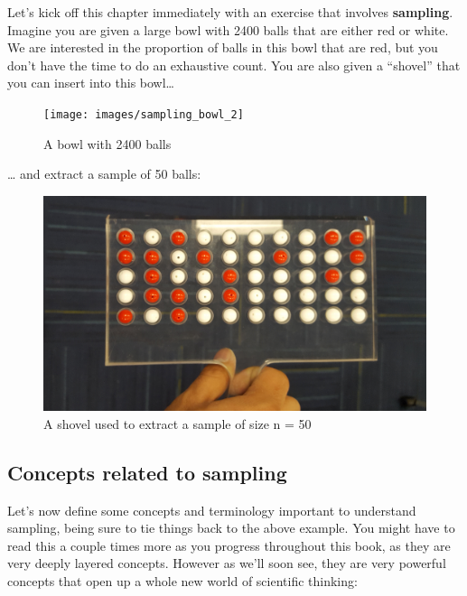 \documentclass[12pt,]{krantz}
\theoremstyle{definition}
\theoremstyle{definition}
\theoremstyle{definition}
\theoremstyle{remark}
\begin{document}
Let's kick off this chapter immediately with an exercise that involves
\textbf{sampling}. Imagine you are given a large bowl with 2400 balls
that are either red or white. We are interested in the proportion of
balls in this bowl that are red, but you don't have the time to do an
exhaustive count. You are also given a ``shovel'' that you can insert
into this bowl\ldots{}

\begin{figure}

{\centering \texttt{[image: images/sampling\_bowl\_2]} 

}

\caption{A bowl with 2400 balls}\label{fig:sampling-exercise-1}
\end{figure}

\ldots{} and extract a sample of 50 balls:

\begin{figure}

{\centering \includegraphics[width=0.8\linewidth]{images/sampling_bowl_3_cropped} 

}

\caption{A shovel used to extract a sample of size n = 50}\label{fig:sampling-exercise-2}
\end{figure}

\subsection*{Concepts related to
sampling}\label{concepts-related-to-sampling}


Let's now define some concepts and terminology important to understand
sampling, being sure to tie things back to the above example. You might
have to read this a couple times more as you progress throughout this
book, as they are very deeply layered concepts. However as we'll soon
see, they are very powerful concepts that open up a whole new world of
scientific thinking:
\end{document}
